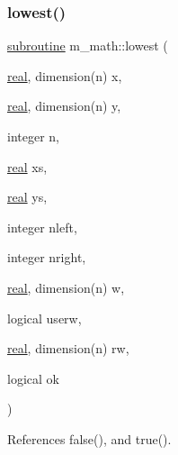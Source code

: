 \subsubsection{\texorpdfstring{lowest()}{lowest()}}
{\footnotesize\ttfamily \hyperlink{M__stopwatch_83_8txt_acfbcff50169d691ff02d4a123ed70482}{subroutine} m\+\_\+math\+::lowest (\begin{DoxyParamCaption}\item[{\hyperlink{read__watch_83_8txt_abdb62bde002f38ef75f810d3a905a823}{real}, dimension(n)}]{x,  }\item[{\hyperlink{read__watch_83_8txt_abdb62bde002f38ef75f810d3a905a823}{real}, dimension(n)}]{y,  }\item[{integer}]{n,  }\item[{\hyperlink{read__watch_83_8txt_abdb62bde002f38ef75f810d3a905a823}{real}}]{xs,  }\item[{\hyperlink{read__watch_83_8txt_abdb62bde002f38ef75f810d3a905a823}{real}}]{ys,  }\item[{integer}]{nleft,  }\item[{integer}]{nright,  }\item[{\hyperlink{read__watch_83_8txt_abdb62bde002f38ef75f810d3a905a823}{real}, dimension(n)}]{w,  }\item[{logical}]{userw,  }\item[{\hyperlink{read__watch_83_8txt_abdb62bde002f38ef75f810d3a905a823}{real}, dimension(n)}]{rw,  }\item[{logical}]{ok }\end{DoxyParamCaption})}



References false(), and true().

